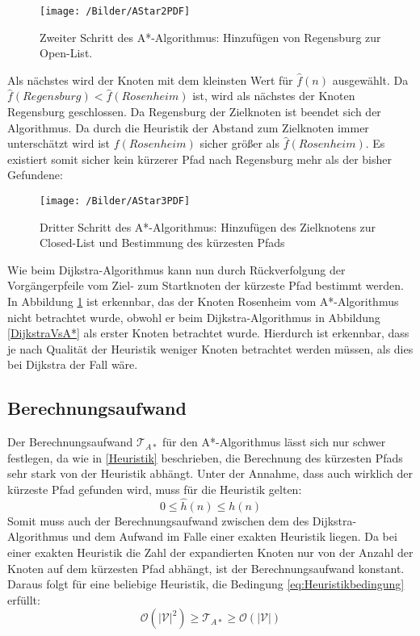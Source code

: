 		\begin{figure}[H]
			\centering
			\texttt{[image: /Bilder/AStar2PDF]}
			\vspace{0.2cm}
			\caption{Zweiter Schritt des A*-Algorithmus: Hinzufügen von Regensburg zur Open-List.}
		\end{figure}
		
		Als nächstes wird der Knoten mit dem kleinsten Wert  für $\hat{f}(n)$ ausgewählt. Da $\hat{f}(Regensburg)<\hat{f}(Rosenheim)$ ist, wird als nächstes der Knoten Regensburg geschlossen. Da Regensburg der Zielknoten ist beendet sich der Algorithmus. Da durch die Heuristik der Abstand zum Zielknoten immer unterschätzt wird ist $f(Rosenheim)$ sicher größer als $\hat{f}(Rosenheim)$. Es existiert somit sicher kein kürzerer Pfad nach Regensburg mehr als der bisher Gefundene:

		\begin{figure}[H]
			\centering
			\texttt{[image: /Bilder/AStar3PDF]}
			\vspace{0.2cm}
			\caption{Dritter Schritt des A*-Algorithmus: Hinzufügen des Zielknotens zur Closed-List und Bestimmung des kürzesten Pfads} \label{A*3}
		\end{figure}
		
		Wie beim Dijkstra-Algorithmus kann nun durch Rückverfolgung der Vorgängerpfeile vom Ziel- zum Startknoten der kürzeste Pfad bestimmt werden. In Abbildung \ref{A*3} ist erkennbar, das der Knoten Rosenheim vom A*-Algorithmus nicht betrachtet wurde, obwohl er beim Dijkstra-Algorithmus in Abbildung \ref{DijkstraVsA*} als erster Knoten betrachtet wurde. Hierdurch ist erkennbar, dass je nach Qualität der Heuristik weniger Knoten betrachtet werden müssen, als dies bei Dijkstra der Fall wäre.
	
	\subsection{Berechnungsaufwand}
		\label{Aufwand_A*}
		Der Berechnungsaufwand $\mathcal{T}_{A*}$ für den A*-Algorithmus lässt sich nur schwer festlegen, da wie in \ref{Heuristik} beschrieben, die Berechnung des kürzesten Pfads sehr stark von der Heuristik abhängt. Unter der Annahme, dass auch wirklich der kürzeste Pfad gefunden wird, muss für die Heuristik gelten:
		\begin{equation} \label{eq:Heuristikbedingung}
			0\le \hat{h}(n)\le h(n)
		\end{equation}
		Somit muss auch der Berechnungsaufwand zwischen dem des Dijkstra-Algorithmus und dem Aufwand im Falle einer exakten Heuristik liegen. Da bei einer exakten Heuristik die Zahl der expandierten Knoten nur von der Anzahl der Knoten auf dem kürzesten Pfad abhängt, ist der Berechnungsaufwand konstant. Daraus folgt für eine beliebige Heuristik, die Bedingung \ref{eq:Heuristikbedingung} erfüllt:
		\begin{equation}
			\mathcal{O}(\lvert \mathcal{V}\rvert ^2)\ge \mathcal{T}_{A*}\ge \mathcal{O}(\lvert \mathcal{V}\rvert)
		\end{equation}
		
